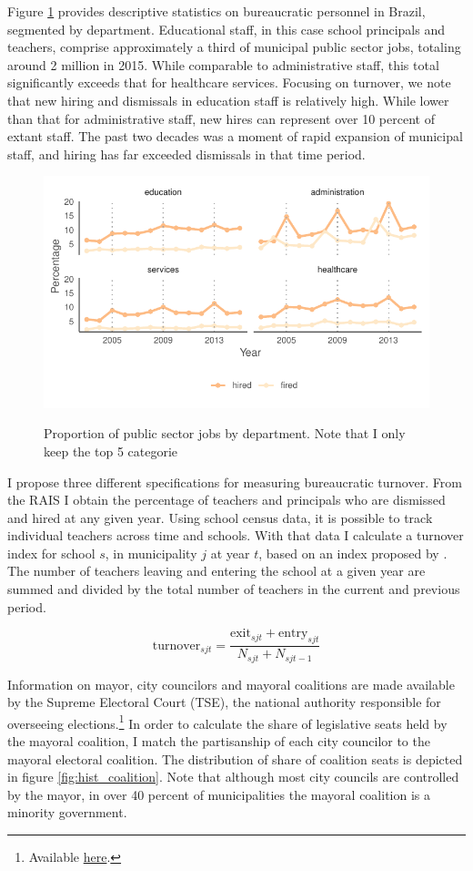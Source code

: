 Figure \ref{fig:staff_turnover} provides descriptive statistics on bureaucratic personnel in Brazil, segmented by department. Educational staff, in this case school principals and teachers, comprise approximately a third of municipal public sector jobs, totaling around 2 million in 2015. While comparable to administrative staff, this total significantly exceeds that for healthcare services. Focusing on turnover, we note that new hiring and dismissals in education staff is relatively high. While lower than that for administrative staff, new hires can represent over 10 percent of extant staff. The past two decades was a moment of rapid expansion of municipal staff, and hiring has far exceeded dismissals in that time period.

\begin{figure}[h]
    \centering
    \includegraphics[width=0.\linewidth]{chapters/chapter_1/plots/descriptive_staff_turnover.pdf}
    \label{fig:staff_turnover}
    \caption{Proportion of public sector jobs by department. Note that I only keep the top 5 categorie}
\end{figure}

I propose three different specifications for measuring bureaucratic turnover. From the RAIS I obtain the percentage of teachers and principals who are dismissed and hired at any given year. Using school census data, it is possible to track individual teachers across time and schools. With that data I calculate a turnover index for school $s$, in municipality $j$ at year $t$, based on an index proposed by \citet{pereira_junior_indicadores_2016}. The number of teachers leaving and entering the school at a given year are summed and divided by the total number of teachers in the current and previous period.

$$\text{turnover}_{sjt} = \frac{\text{exit}_{sjt} + \text{entry}_{sjt}}{N_{sjt} + N_{sjt-1}}$$


Information on mayor, city councilors and mayoral coalitions are made available by the Supreme Electoral Court (TSE), the national authority responsible for overseeing elections.\footnote{Available \hyperlink{http://www.tse.jus.br/eleicoes/estatisticas/repositorio-de-dados-eleitorais-1}{here}.} In order to calculate the share of legislative seats held by the mayoral coalition, I match the partisanship of each city councilor to the mayoral electoral coalition. The distribution of share of coalition seats is depicted in figure \ref{fig:hist_coalition}. Note that although most city councils are controlled by the mayor, in over 40 percent of municipalities the mayoral coalition is a minority government.

